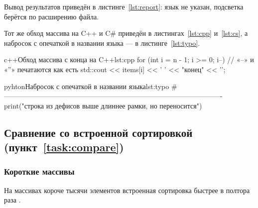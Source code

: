 \documentclass{mtuci-report}
\begin{document}
Вывод результатов приведён в листинге~\ref{lst:report}: язык не указан, подсветка берётся
по расширению файла.

Тот же обход массива на C++ и C\# приведён в листингах~\ref{lst:cpp} и~\ref{lst:cs},
а набросок с опечаткой в названии языка — в листинге~\ref{lst:typo}.
\begin{bbtcode}{c++}{Обход массива с конца на C++}{lst:cpp}
for (int i = n - 1; i >= 0; i--) {  // «--» и «''» печатаются как есть
    std::cout << items[i] << ' ' << "конец" << '\n';
}
\end{bbtcode}
\begin{bbtcode}{pyhton}{Набросок с опечаткой в названии языка}{lst:typo}
# ----------------------------------------------------------------------------------------------
print("строка из дефисов выше длиннее рамки, но переносится")
\end{bbtcode}

\subsection{Сравнение со встроенной сортировкой (пункт~\ref{task:compare})}
\subsubsection{Короткие массивы}
На массивах короче тысячи элементов встроенная сортировка быстрее в полтора раза
\cite[с.~132]{knuth}.
\end{document}
